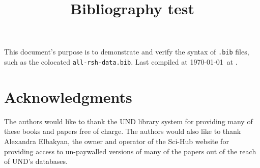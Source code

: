\documentclass{IEEEtran}
\title{Bibliography test}
\begin{document}
\maketitle
This document's purpose is to demonstrate and verify the syntax of \verb|.bib| files,
such as the colocated \verb|all-rsh-data.bib|.  Last compiled at \today\ at \currenttime.

\section{Acknowledgments}

The authors would like to thank the UND library system for providing many of these books and
papers free of charge.  The authors would also like to thank Alexandra Elbakyan, the owner
and operator of the Sci-Hub website for providing access to un-paywalled versions of many
of the papers out of the reach of UND's databases.


\nocite{*}

\end{document}

